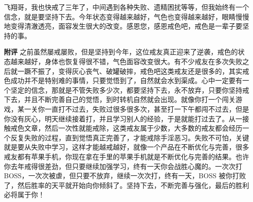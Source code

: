 \begin{case}
    飞翔哥，我也快戒了三年了，中间遇到各种失败、遗精困扰等等，但我始终有一个信念，就是要坚持下去。今年状态变得越来越好，气色也变得越来越好，眼睛慢慢地变得清澈透亮，面容发生很大的改变。感恩您，感恩戒色吧，戒色是一辈子要坚持的事。

    \textbf{附评} 之前虽然屡戒屡败，但是坚持到今年，这位戒友真正迎来了逆袭，戒色的状态越来越好，身体也恢复得很不错，气色面容改变很大。有不少戒友在多次失败之后就一蹶不振了，变得灰心丧气、破罐破摔，戒色吧这类戒友还是很多的，其实戒色成功并不是特别难的事情，只要觉悟到了，自然就会水到渠成。心中一定要有一个坚定的信念，那就是不管失败多少次，都要坚持下去，永不放弃，只要你坚持戒下去，并且不断完善自己的觉悟，到时转机自然就会出现。就像你打一个闯关游戏，某一关你一直打不过去，失败过很多很多次，甚至打一下午都闯不过去，但是你没有灰心，明天继续接着打，并且学习别人的经验，于是就能打过去了。从一接触戒色文章，然后一次性就能戒除，这类戒友属于少数，大多数的戒友都会经历一个反复失败的过程，直到觉悟真正完善了，才能戒除手淫恶习。失败不可怕，关键就是要从失败中学习，这样才能越戒越好，就像一个产品在不断优化与完善，很多戒友都有苹果手机，你现在拿在手里的苹果手机就是不断优化与完善的结果。也许你去年戒得很差劲，但只要继续加强学习，终有一天你会战胜心魔的。一次次打 BOSS，一次次被虐，但只要不放弃，继续一次次打，终有一天，BOSS 被你打败了，然后胜率的天平就开始向你倾斜了。坚持下去，不断完善与强化，最后的胜利必将属于你！
\end{case}


